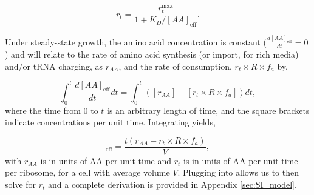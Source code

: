 \begin{equation}
r_t = \frac{r_{t}^{\text{max}}}{1 + K_D/[AA]_{\text{eff}}}.
\label{eq:rt_kd_simple}
\end{equation}

Under steady-state growth, the amino acid concentration is constant
($\frac{d[AA]_\text{eff}}{dt}=0$) and will relate to the rate of amino acid
synthesis (or import, for rich media) and/or tRNA charging, as $r_{AA}$, and the
rate of consumption, $r_t\times R \times f_a$ by,

\begin{equation}
\int_{0}^{t} \frac{d[AA]_{\text{eff}}}{dt} dt =  \int_{0}^{t}([r_{AA}] - [r_t\times R \times f_a]) dt,
\label{eq:aaeff_int}
\end{equation}
where the time from 0 to $t$ is an arbitrary length of time, and the square
brackets indicate concentrations per unit time. Integrating 
yields,

\begin{equation}
   [AA]_\text{eff} = \frac{t(r_{AA} - r_t \times R \times f_a)}{V},
   \label{eq:aa_final}
\end{equation}
with  $r_{AA}$ is in units of AA per unit time and $r_t$ is in units of AA per
unit time per ribosome, for a cell with average volume $V$. Plugging 
into  allows us to then solve for $r_t$ and
a complete derivation is provided in Appendix \ref{sec:SI_model}.

